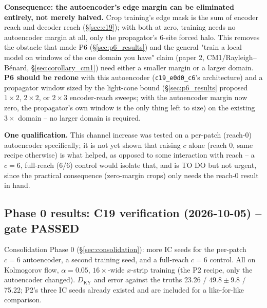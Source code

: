 \documentclass[11pt]{article}
\begin{document}
\textbf{Consequence: the autoencoder's edge margin can be eliminated
entirely, not merely halved.} Crop training's edge mask is the sum of
encoder reach and decoder reach (\S\ref{sec:c19}); with both at zero,
training needs no autoencoder margin at all, only the propagator's
6-site forced halo. This removes the obstacle that made P6
(\S\ref{sec:p6_results}) and the general "train a local model on
windows of the one domain you have" claim (paper 2, CM1/Rayleigh--B\'enard,
\S\ref{sec:corollary_cm1}) need either a smaller margin or a larger
domain. \textbf{P6 should be redone} with this autoencoder
(\texttt{c19\_e0d0\_c6}'s architecture) and a propagator window sized
by the light-cone bound (\S\ref{sec:p6_results} proposed $1\times2$,
$2\times2$, or $2\times3$ encoder-reach sweeps; with the autoencoder
margin now zero, the propagator's own window is the only thing left to
size) on the existing $3\times$ domain -- no larger domain is required.

\textbf{One qualification.} This channel increase was tested on a
per-patch (reach-0) autoencoder specifically; it is not yet shown that
raising $c$ alone (reach 0, same recipe otherwise) is what helped, as
opposed to some interaction with reach -- a $c{=}6$, full-reach
(6/6) control would isolate that, and is TO DO but not urgent, since
the practical consequence (zero-margin crops) only needs the reach-0
result in hand.

\subsection{Phase 0 results: C19 verification (2026-10-05) -- gate PASSED}
\label{sec:phase0_results}

Consolidation Phase 0 (\S\ref{sec:consolidation}): more IC seeds for the
per-patch $c{=}6$ autoencoder, a second training seed, and a
full-reach $c{=}6$ control. All on Kolmogorov flow, $\alpha{=}0.05$,
$16\times$-wide $x$-strip training (the P2 recipe, only the
autoencoder changed). $D_{\mathrm{KY}}$ and error against the truths
23.26 / $49.8\pm9.8$ / 75.22; P2's three IC seeds already existed and are
included for a like-for-like comparison.
\end{document}
